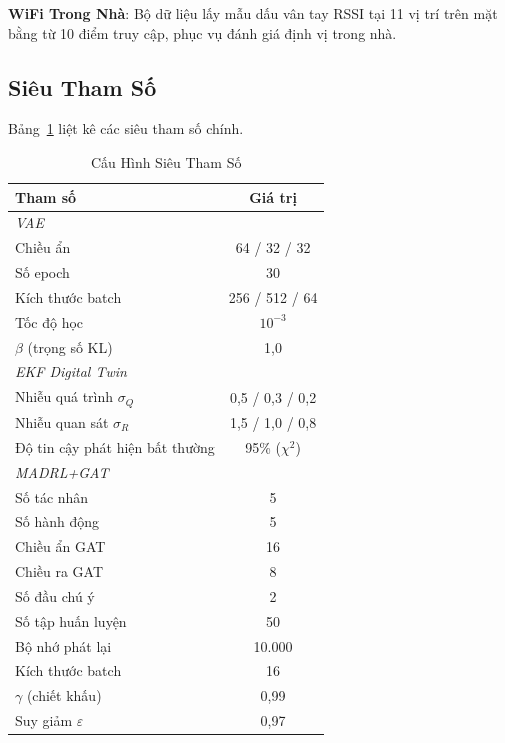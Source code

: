 \documentclass[conference]{IEEEtran}
\begin{document}
\textbf{WiFi Trong Nhà}: Bộ dữ liệu lấy mẫu dấu vân tay RSSI
tại 11 vị trí trên mặt bằng từ 10 điểm truy cập, phục vụ đánh
giá định vị trong nhà.

\subsection{Siêu Tham Số}
Bảng~\ref{tab:hyperparams} liệt kê các siêu tham số chính.

\begin{table}[h]
\centering
\caption{Cấu Hình Siêu Tham Số}
\label{tab:hyperparams}
\begin{tabular}{lc}
\toprule
\textbf{Tham số} & \textbf{Giá trị} \\
\midrule
\multicolumn{2}{l}{\textit{VAE}} \\
Chiều ẩn           & 64 / 32 / 32 \\
Số epoch            & 30 \\
Kích thước batch    & 256 / 512 / 64 \\
Tốc độ học          & $10^{-3}$ \\
$\beta$ (trọng số KL) & 1,0 \\
\midrule
\multicolumn{2}{l}{\textit{EKF Digital Twin}} \\
Nhiễu quá trình $\sigma_Q$ & 0,5 / 0,3 / 0,2 \\
Nhiễu quan sát $\sigma_R$  & 1,5 / 1,0 / 0,8 \\
Độ tin cậy phát hiện bất thường & 95\% ($\chi^2$) \\
\midrule
\multicolumn{2}{l}{\textit{MADRL+GAT}} \\
Số tác nhân          & 5 \\
Số hành động         & 5 \\
Chiều ẩn GAT         & 16 \\
Chiều ra GAT         & 8 \\
Số đầu chú ý         & 2 \\
Số tập huấn luyện    & 50 \\
Bộ nhớ phát lại      & 10.000 \\
Kích thước batch      & 16 \\
$\gamma$ (chiết khấu) & 0,99 \\
Suy giảm $\varepsilon$ & 0,97 \\
\bottomrule
\end{tabular}
\end{table}
\end{document}
